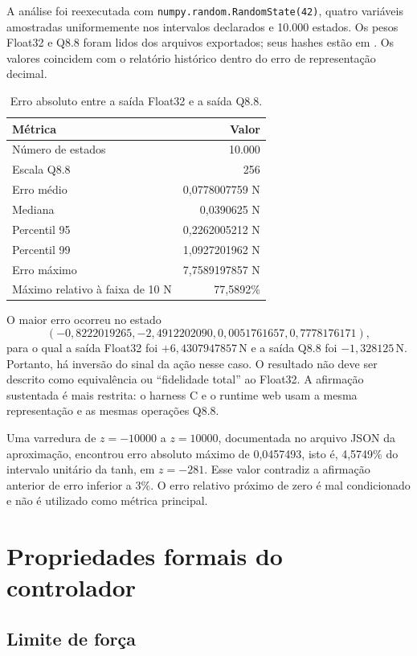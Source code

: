 A análise foi reexecutada com \texttt{numpy.random.RandomState(42)}, quatro
variáveis amostradas uniformemente nos intervalos declarados e 10.000 estados.
Os pesos Float32 e Q8.8 foram lidos dos arquivos exportados; seus hashes estão
em . Os valores coincidem com o
relatório histórico dentro do erro de representação decimal.

\begin{table}[H]
\centering
\caption{Erro absoluto entre a saída Float32 e a saída Q8.8.}
\label{tab:fidelidade}
\begin{tabular}{lr}
\toprule
Métrica & Valor \\
\midrule
Número de estados & 10.000 \\
Escala Q8.8 & 256 \\
Erro médio & 0,0778007759 N \\
Mediana & 0,0390625 N \\
Percentil 95 & 0,2262005212 N \\
Percentil 99 & 1,0927201962 N \\
Erro máximo & 7,7589197857 N \\
Máximo relativo à faixa de 10 N & 77,5892\% \\
\bottomrule
\end{tabular}
\end{table}

O maior erro ocorreu no estado
\[
(-0{,}8222019265,-2{,}4912202090,0{,}0051761657,0{,}7778176171),
\]
para o qual a saída Float32 foi \(+6{,}4307947857\,\mathrm{N}\) e a saída Q8.8
foi \(-1{,}328125\,\mathrm{N}\). Portanto, há inversão do sinal da ação nesse
caso. O resultado não deve ser descrito como equivalência ou “fidelidade total”
ao Float32. A afirmação sustentada é mais restrita: o harness C e o runtime web
usam a mesma representação e as mesmas operações Q8.8.

Uma varredura de \(z=-10000\) a \(z=10000\), documentada no arquivo JSON da
aproximação, encontrou erro absoluto máximo de
0,0457493, isto é, 4,5749\% do intervalo unitário da tanh, em \(z=-281\).
Esse valor contradiz a afirmação anterior de erro inferior a 3\%. O erro relativo
próximo de zero é mal condicionado e não é utilizado como métrica principal.

\section{Propriedades formais do controlador}

\subsection{Limite de força}

